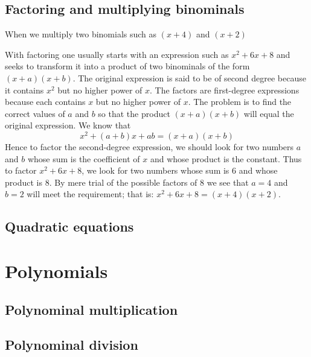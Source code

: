 

\subsection{Factoring and multiplying binominals}
When we multiply two binomials such as $(x+4)$ and $(x+2)$



With factoring one usually starts with an expression such as $x^2 + 6 x + 8$ and seeks to transform it into a product of two binominals of the form $(x + a)(x + b)$. The original expression is said to be of second degree because it contains $x^2$ but no higher power of $x$. The factors are first-degree expressions because each contains $x$ but  no higher power of $x$. The problem is to find the correct values of $a$ and $b$ so that the product $(x + a)(x + b)$ will equal the original
expression. We know that
\begin{equation}\label{alg:binom_factor}
x^2 + (a + b)x + ab = (x + a)(x + b)
\end{equation}
Hence to factor the second-degree expression, we should look for two numbers $a$ and $b$ whose sum is the coefficient of $x$ and whose product is the constant. Thus to factor $x^2 + 6 x + 8$, we look for two numbers whose sum is $6$ and whose product is $8$. By mere trial of the possible factors of $8$ we see that $a = 4$ and $b = 2$ will meet the requirement; that is: $x^2 + 6 x + 8 = (x + 4)(x + 2)$.


\subsection{Quadratic equations}

\section{Polynomials}

\subsection{Polynominal multiplication}

\subsection{Polynominal division}

